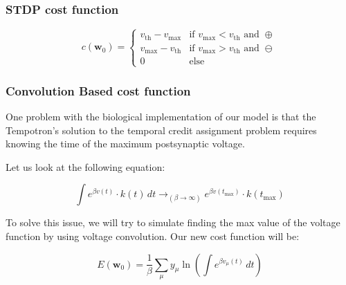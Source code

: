 \subsubsection{STDP cost function}

\begin{equation}
    c(\mathbf{w}_0) = \begin{cases}
    v_{\text{th}} - v_{\text{max}} & \text{if } v_{\text{max}} < v_{\text{th}} \text{ and } \oplus \\
    v_{\text{max}} - v_{\text{th}} & \text{if } v_{\text{max}} > v_{\text{th}} \text{ and } \ominus \\
    0 & \text{else}
    \end{cases}
\end{equation}

\subsubsection{Convolution Based cost function}

One problem with the biological implementation of our model is that the Tempotron’s solution to the temporal credit assignment problem requires knowing the time of the maximum postsynaptic voltage.

Let us look at the following equation:

\begin{equation}
    \int e^{\beta v(t)} \cdot k(t) \, dt \rightarrow_{(\beta \rightarrow \infty)} e^{\beta v(t_{\text{max}})} \cdot k(t_{\text{max}})
\end{equation}

To solve this issue, we will try to simulate finding the max value of the voltage function by using voltage convolution. Our new cost function will be:

\begin{equation}
    E(\mathbf{w}_0) = \frac{1}{\beta} \sum_{\mu} y_{\mu} \ln\left(\int e^{\beta v_{\mu}(t)} \, dt\right)
\end{equation}

